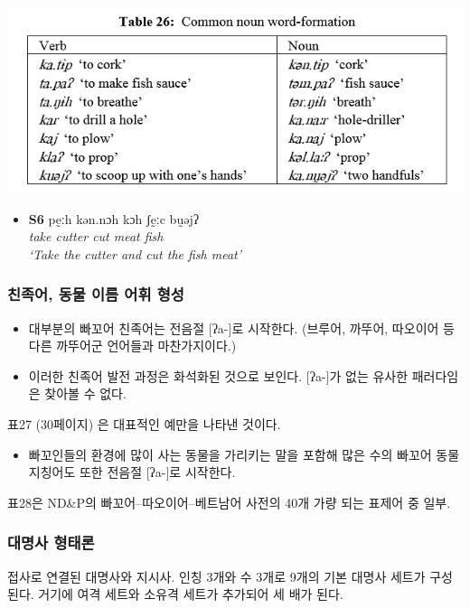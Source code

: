 \includegraphics{Pacoh/src/PacohTable26.png}	


\begin{itemize}
\item \textbf{S6}
\gll pḛːh kən.nɔh kɔh ʃḛːc bṵəjʔ\\
\itshape{take} \itshape{cutter} \itshape{cut} \itshape{meat} \itshape{fish} \\
`Take the cutter and cut the fish meat'
\end{itemize}

\subsubsection{친족어, 동물 이름 어휘 형성}
\begin{itemize}
\item 대부분의 빠꼬어 친족어는 전음절 [ʔa-]로 시작한다. (브루어, 까뚜어, 따오이어 등 다른 까뚜어군 언어들과 마찬가지이다.)
\item 이러한 친족어 발전 과정은 화석화된 것으로 보인다. [ʔa-]가 없는 유사한 패러다임은 찾아볼 수 없다.
\end{itemize}

표27 (30페이지) 은 대표적인 예만을 나타낸 것이다.

\begin{itemize}
\item 빠꼬인들의 환경에 많이 사는 동물을 가리키는 말을 포함해 많은 수의 빠꼬어 동물 지칭어도 또한 전음절 [ʔa-]로 시작한다.
\end{itemize}

표28은 ND\&P의 빠꼬어--따오이어--베트남어 사전의 40개 가량 되는 표제어 중 일부.

\subsubsection{대명사 형태론}
접사로 연결된 대명사와 지시사.
인칭 3개와 수 3개로 9개의 기본 대명사 세트가 구성된다. 거기에 여격 세트와 소유격 세트가 추가되어 세 배가 된다.

